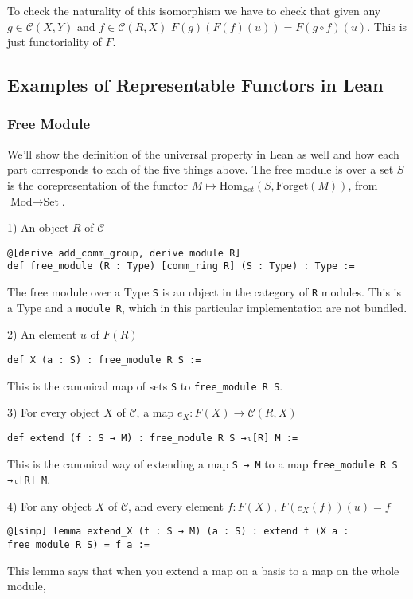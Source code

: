 \documentclass[12pt]{article} %
\theoremstyle{definition}
\theoremstyle{definition}
\theoremstyle{definition}
\theoremstyle{definition}
\begin{document}
To check the naturality of this isomorphism we have to check that given
any $g \in \mathcal{C}(X,Y)$ and $f \in \mathcal{C}(R, X)$
$F(g)(F(f)(u)) = F(g \circ f)(u)$. This is just functoriality of $F$.

\subsection{Examples of Representable Functors in Lean}

\subsubsection{Free Module}
We'll show the definition of the universal property in Lean as well and how each part corresponds to each
of the five things above. The free module is over a set $S$ is the corepresentation of the functor
$M \mapsto \text{Hom}_{Set}(S, \text{Forget}(M))$, from $\text{Mod} \to \text{Set}$.

1) An object $R$ of $\mathcal{C}$
\begin{lstlisting}
@[derive add_comm_group, derive module R]
def free_module (R : Type) [comm_ring R] (S : Type) : Type :=
\end{lstlisting}
The free module over a Type \lstinline{S} is an object in the category of \lstinline{R}
modules. This is a Type and a \lstinline{module R}, which in this particular implementation
are not bundled.


2) An element $u$ of $F(R)$
\begin{lstlisting}
def X (a : S) : free_module R S :=
\end{lstlisting}
This is the canonical map of sets \lstinline{S} to \lstinline{free_module R S}.

3) For every object $X$ of $\mathcal{C}$, a map $e_X : F(X) \to \mathcal{C}(R, X)$
\begin{lstlisting}
def extend (f : S → M) : free_module R S →ₗ[R] M :=
\end{lstlisting}
This is the canonical way of extending a map \lstinline{S → M} to a map
\lstinline{free_module R S →ₗ[R] M}.

4) For any object $X$ of $\mathcal{C}$, and every element $f : F(X)$, $F(e_X(f))(u) = f$
\begin{lstlisting}
@[simp] lemma extend_X (f : S → M) (a : S) : extend f (X a : free_module R S) = f a :=
\end{lstlisting}
This lemma says that when you extend a map on a basis to a map on the whole module,
\end{document}
